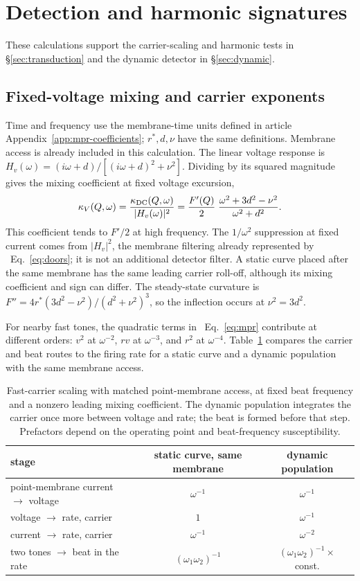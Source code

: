 \documentclass[11pt,a4paper]{article}
\newif\ifsupp
\begin{document}
\section{Detection and harmonic signatures}\label{supp:detection}
These calculations support the carrier-scaling and harmonic tests in
\S\ref{sec:transduction} and the dynamic detector in \S\ref{sec:dynamic}.
\subsection{Fixed-voltage mixing and carrier exponents}\label{supp:dynamic-details}
Time and frequency use the membrane-time units defined in article
Appendix~\ref{app:mpr-coefficients}; $r^*,d,\nu$ have the same definitions.
Membrane access is already included in this calculation. The linear voltage response
is $H_v(\omega)=(i\omega+d)/[(i\omega+d)^2+\nu^2]$. Dividing by its squared magnitude
gives the mixing coefficient at fixed voltage excursion,
\begin{equation}
\kappa_V(Q,\omega)=\frac{\kappa_{\rm DC}(Q,\omega)}{|H_v(\omega)|^2}
=\frac{F'(Q)}{2}\;\frac{\omega^2+3d^2-\nu^2}{\omega^2+d^2}.
\label{eq:kfixed}
\end{equation}
This coefficient tends to $F'/2$ at high frequency. The $1/\omega^2$ suppression
at fixed current comes from $|H_v|^2$, the membrane filtering already represented
by \ifsupp main-text\fi\ Eq.~\eqref{eq:doors}; it is not an additional detector filter. A static curve
placed after the same membrane has the same leading carrier roll-off, although
its mixing coefficient and sign can differ. The steady-state curvature is
$F''=4r^*(3d^2-\nu^2)/(d^2+\nu^2)^3$, so the inflection occurs at $\nu^2=3d^2$.

For nearby fast tones, the quadratic terms in \ifsupp main-text\fi\ Eq.~\eqref{eq:mpr} contribute at
different orders: $v^2$ at $\omega^{-2}$, $r v$ at $\omega^{-3}$, and $r^2$ at
$\omega^{-4}$. Table~\ref{tab:exponents} compares the carrier and beat routes to
the firing rate for a static curve and a dynamic population with the same membrane access.

\begin{table}[h]
\centering\small
\begin{tabular}{lcc}
\toprule
stage & static curve, same membrane & dynamic population \\
\midrule
point-membrane current $\to$ voltage & $\omega^{-1}$ & $\omega^{-1}$ \\
voltage $\to$ rate, carrier & $1$ & $\omega^{-1}$ \\
current $\to$ rate, carrier & $\omega^{-1}$ & $\omega^{-2}$ \\
two tones $\to$ beat in the rate & $(\omega_1\omega_2)^{-1}$ & $(\omega_1\omega_2)^{-1}\times$ const. \\
\bottomrule
\end{tabular}
\caption{Fast-carrier scaling with matched point-membrane access, at fixed beat frequency
and a nonzero leading mixing coefficient. The dynamic population integrates the
carrier once more between voltage and rate; the beat is formed before that step.
Prefactors depend on the operating point and beat-frequency susceptibility.}
\label{tab:exponents}
\end{table}
\end{document}
